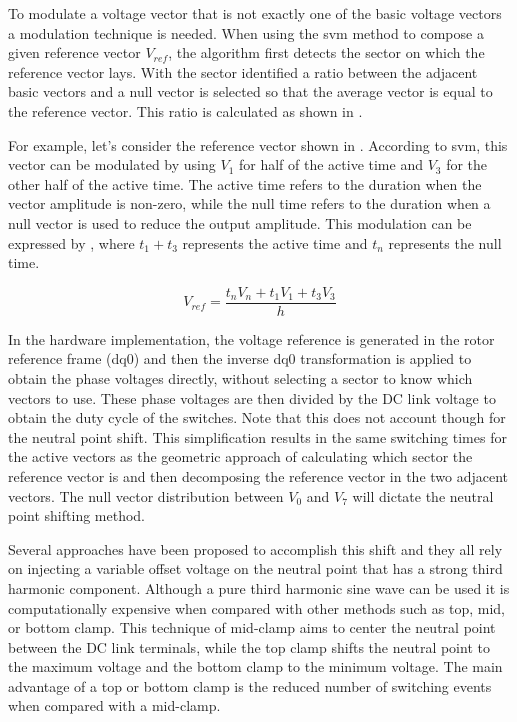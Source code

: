 To modulate a voltage vector that is not exactly one of the basic voltage vectors a modulation technique is needed. When using the \gls{svm} method to compose a given reference vector $V_{ref}$, the algorithm first detects the sector on which the reference vector lays. With the sector identified a ratio between the adjacent basic vectors and a null vector is selected so that the average vector is equal to the reference vector. This ratio is calculated as shown in .

For example, let's consider the reference vector shown in . According to \gls{svm}, this vector can be modulated by using $V_1$ for half of the active time and $V_3$ for the other half of the active time. The active time refers to the duration when the vector amplitude is non-zero, while the null time refers to the duration when a null vector is used to reduce the output amplitude. This modulation can be expressed by , where $t_1+t_3$ represents the active time and $t_{n}$ represents the null time.

\begin{equation}
	V_{ref} = \frac{t_{n} V_{n} + t_1 V_1  + t_3 V_3}{h}
	\label{eq:svm_vref}
\end{equation}



In the hardware implementation, the voltage reference is generated in the rotor reference frame (dq0) and then the inverse dq0 transformation is applied to obtain the phase voltages directly, without selecting a sector to know which vectors to use. These phase voltages are then divided by the DC link voltage to obtain the duty cycle of the switches. Note that this does not account though for the neutral point shift. This simplification results in the same switching times for the active vectors as the geometric approach of calculating which sector the reference vector is and then decomposing the reference vector in the two adjacent vectors. The null vector distribution between $V_0$ and $V_7$ will dictate the neutral point shifting method. 

Several approaches have been proposed to accomplish this shift and they all rely on injecting a variable offset voltage on the neutral point that has a strong third harmonic component. Although a pure third harmonic sine wave can be used it is computationally expensive when compared with other methods such as top, mid, or bottom clamp. This technique of mid-clamp aims to center the neutral point between the DC link terminals, while the top clamp shifts the neutral point to the maximum voltage and the bottom clamp to the minimum voltage. The main advantage of a top or bottom clamp is the reduced number of switching events when compared with a mid-clamp. 

